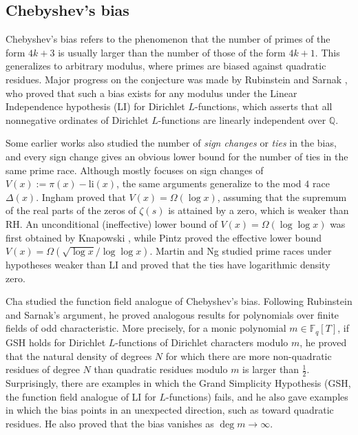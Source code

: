 \documentclass[10pt,reqno]{amsproc}
\newcommand{\bF}{\mathbb{F}}
\newcommand{\bQ}{\mathbb{Q}}
\newcommand{\1}{\mathds{1}}	%
\theoremstyle{definition}
\theoremstyle{remark}
\begin{document}
\subsection{Chebyshev's bias}
\label{subsec:prelim_chebyshev}

Chebyshev's bias \cite{chebyshev1853lettre} refers to the phenomenon that the number of primes of the form $4k + 3$ is usually larger than the number of those of the form $4k + 1$.
This generalizes to arbitrary modulus, where primes are biased against quadratic residues.
Major progress on the conjecture was made by Rubinstein and Sarnak \cite{rubinstein1994chebyshev}, who proved that such a bias exists for any modulus under the Linear Independence hypothesis (LI) for Dirichlet $L$-functions, which asserts that all nonnegative ordinates of Dirichlet $L$-functions are linearly independent over $\bQ$.

Some earlier works \cite{ingham1935note,knapowski1961sign,pintzsign,martin2020inclusive} also studied the number of \emph{sign changes} or \emph{ties} in the bias, and every sign change gives an obvious lower bound for the number of ties in the same prime race.
Although \cite{ingham1935note,pintzsign,knapowski1961sign} mostly focuses on sign changes of $V(x) := \pi(x) - \mathrm{li}(x)$, the same arguments generalize to the mod $4$ race $\Delta(x)$.
Ingham \cite{ingham1935note} proved that $V(x) = \Omega(\log x)$, assuming that the supremum of the real parts of the zeros of $\zeta(s)$ is attained by a zero, which is weaker than RH.
An unconditional (ineffective) lower bound of $V(x) = \Omega(\log \log x)$ was first obtained by Knapowski \cite{knapowski1961sign}, while Pintz \cite{pintzsign} proved the effective lower bound $V(x) = \Omega(\sqrt{\log x} / \log \log x)$.
Martin and Ng \cite{martin2020inclusive} studied prime races under hypotheses weaker than LI and proved that the ties have logarithmic density zero.

Cha \cite{cha2008chebyshev} studied the function field analogue of Chebyshev's bias. Following Rubinstein and Sarnak's argument, he proved analogous results for polynomials over finite fields of odd characteristic.
More precisely, for a monic polynomial $m \in \bF_q[T]$, if GSH holds for Dirichlet $L$-functions of Dirichlet characters modulo $m$, he proved that the natural density of degrees $N$ for which there are more non-quadratic residues of degree $N$ than quadratic residues modulo $m$ is larger than $\frac{1}{2}$.
Surprisingly, there are examples in which the Grand Simplicity Hypothesis (GSH, the function field analogue of LI for $L$-functions) fails, and he also gave examples in which the bias points in an unexpected direction, such as toward quadratic residues.
He also proved that the bias vanishes as $\deg m \to \infty$.
\end{document}
